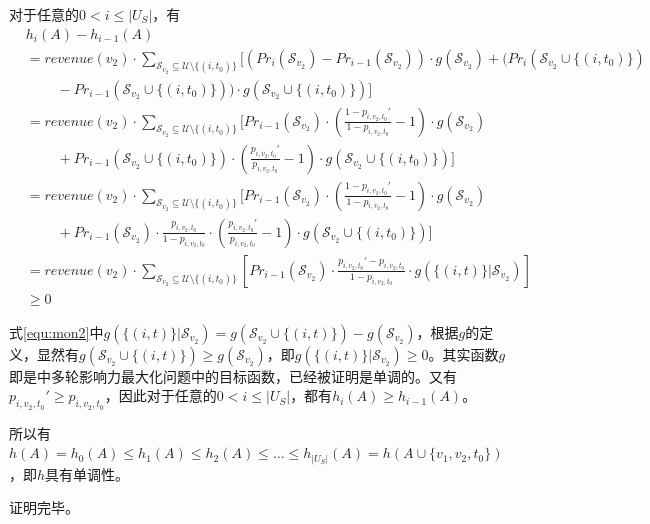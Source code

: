 对于任意的$0<i\le |U_S|$，有
\begin{align}
    &h_i(A)-h_{i-1}(A)\\
    &=revenue(v_2)\cdot \sum_{\mathcal{S}_{v_2}\subseteq \mathcal{U}\setminus \{(i,t_0)\}}[(Pr_i(\mathcal{S}_{v_2})-Pr_{i-1}(\mathcal{S}_{v_2}))\cdot g(\mathcal{S}_{v_2}) + (Pr_i(\mathcal{S}_{v_2}\cup \{(i,t_0)\}) \nonumber \\
    &\ \ \ \ \ \ \ \ \ \ -Pr_{i-1}(\mathcal{S}_{v_2}\cup \{(i,t_0)\}))\cdot g(\mathcal{S}_{v_2}\cup \{(i,t_0)\})] \\ 
    &=revenue(v_2)\cdot \sum_{\mathcal{S}_{v_2}\subseteq \mathcal{U}\setminus \{(i,t_0)\}}[Pr_{i-1}(\mathcal{S}_{v_2})\cdot\left(\frac{1-p_{i,v_2,t_0}'}{1-p_{i,v_2,t_0}}-1\right) \cdot g(\mathcal{S}_{v_2})  \nonumber \\ 
    &\ \ \ \ \ \ \ \ \ \ + Pr_{i-1}(\mathcal{S}_{v_2}\cup \{(i,t_0)\})\cdot (\frac{p_{i,v_2,t_0}'}{p_{i,v_2,t_0}}-1)\cdot g(\mathcal{S}_{v_2}\cup \{(i,t_0)\}) ]  \\ 
    &=revenue(v_2)\cdot \sum_{\mathcal{S}_{v_2}\subseteq \mathcal{U}\setminus \{(i,t_0)\}}[Pr_{i-1}(\mathcal{S}_{v_2})\cdot\left(\frac{1-p_{i,v_2,t_0}'}{1-p_{i,v_2,t_0}}-1\right) \cdot g(\mathcal{S}_{v_2}) \nonumber \\ 
    &\ \ \ \ \ \ \ \ \ \ + Pr_{i-1}(\mathcal{S}_{v_2})\cdot\frac{p_{i,v_2,t_0}}{1-p_{i,v_2,t_0}}\cdot (\frac{p_{i,v_2,t_0}'}{p_{i,v_2,t_0}}-1)\cdot g(\mathcal{S}_{v_2}\cup \{(i,t_0)\}) ] \\
    &=revenue(v_2)\cdot \sum_{\mathcal{S}_{v_2}\subseteq \mathcal{U}\setminus \{(i,t_0)\}}[Pr_{i-1}(\mathcal{S}_{v_2})\cdot\frac{p_{i,v_2,t_0}'-p_{i,v_2,t_0}}{1-p_{i,v_2,t_0}} \cdot g(\{(i,t)\} |\mathcal{S}_{v_2})] \label{equ:mon2} \\ 
    &\ge 0 
\end{align}

\noindent 式\ref{equ:mon2}中$g(\{(i,t)\} |\mathcal{S}_{v_2})=g(\mathcal{S}_{v_2}\cup\{(i,t)\})-g(\mathcal{S}_{v_2})$，根据$g$的定义，显然有$g(\mathcal{S}_{v_2}\cup\{(i,t)\})\ge g(\mathcal{S}_{v_2})$，即$g(\{(i,t)\} |\mathcal{S}_{v_2}) \ge 0$。其实函数$g$即是\parencite{mrim}中多轮影响力最大化问题中的目标函数，已经被证明是单调的。又有$p_{i,v_2,t_0}'\ge p_{i,v_2,t_0}$，因此对于任意的$0<i\le |U_S|$，都有$h_i(A) \ge h_{i-1}(A)$。

所以有$h(A)=h_0(A) \le h_1(A) \le h_2(A) \le \ldots \le h_{|U_S|}(A)=h(A \cup\{v_1,v_2,t_0\})$，即$h$具有单调性。

\noindent 证明完毕。

